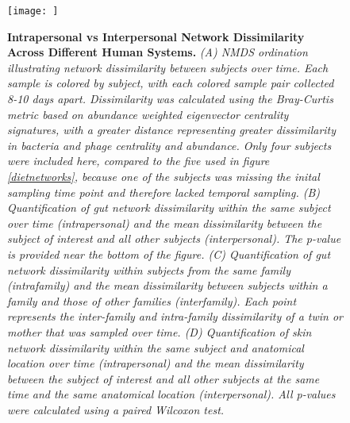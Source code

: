 \documentclass[12pt,]{article}
\begin{document}
\begin{figure}[htbp]
\centering
\texttt{[image: ]}
\caption{\textbf{Intrapersonal vs Interpersonal Network Dissimilarity
Across Different Human Systems.} \emph{(A) NMDS ordination illustrating
network dissimilarity between subjects over time. Each sample is colored
by subject, with each colored sample pair collected 8-10 days apart.
Dissimilarity was calculated using the Bray-Curtis metric based on
abundance weighted eigenvector centrality signatures, with a greater
distance representing greater dissimilarity in bacteria and phage
centrality and abundance. Only four subjects were included here,
compared to the five used in figure \ref{dietnetworks}, because one of
the subjects was missing the inital sampling time point and therefore
lacked temporal sampling. (B) Quantification of gut network
dissimilarity within the same subject over time (intrapersonal) and the
mean dissimilarity between the subject of interest and all other
subjects (interpersonal). The p-value is provided near the bottom of the
figure. (C) Quantification of gut network dissimilarity within subjects
from the same family (intrafamily) and the mean dissimilarity between
subjects within a family and those of other families (interfamily). Each
point represents the inter-family and intra-family dissimilarity of a
twin or mother that was sampled over time. (D) Quantification of skin
network dissimilarity within the same subject and anatomical location
over time (intrapersonal) and the mean dissimilarity between the subject
of interest and all other subjects at the same time and the same
anatomical location (interpersonal). All p-values were calculated using
a paired Wilcoxon test.}\label{intradiv}}
\end{figure}
\end{document}
